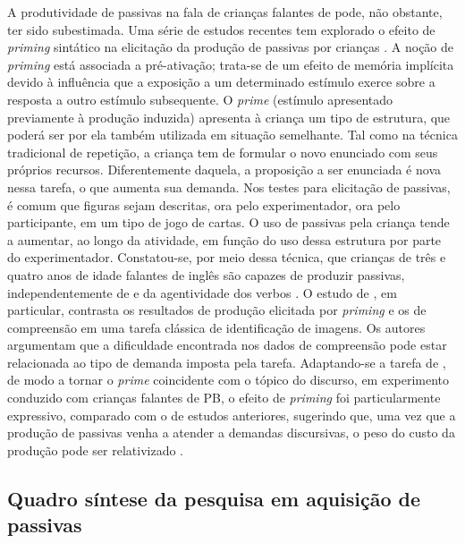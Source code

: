 \documentclass[output=paper]{LSP/langsci}
\begin{document}
A produtividade de passivas na fala de crianças falantes de  pode, não obstante, ter sido subestimada. Uma série de estudos recentes tem explorado o efeito de \textit{priming} sintático na elicitação da produção de passivas por crianças \citep{bencinivalian2008,manetti2012,messenger_etal2012}. A noção de \textit{priming} está associada a pré-ativação; trata-se de um efeito de memória implícita devido à influência que a exposição a um determinado estímulo exerce sobre a resposta a outro estímulo subsequente. O \textit{prime} (estímulo apresentado previamente à produção induzida) apresenta à criança um tipo de estrutura, que poderá ser por ela também utilizada em situação semelhante. Tal como na técnica tradicional de repetição, a criança tem de formular o novo enunciado com seus próprios recursos. Diferentemente daquela, a proposição a ser enunciada é nova nessa tarefa, o que aumenta sua demanda. Nos testes para elicitação de passivas, é comum que figuras sejam descritas, ora pelo experimentador, ora pelo participante, em um tipo de jogo de cartas. O uso de passivas pela criança tende a aumentar, ao longo da atividade, em função do uso dessa estrutura por parte do experimentador. Constatou-se, por meio dessa técnica, que crianças de três e quatro anos de idade falantes de inglês são capazes de produzir passivas, independentemente de  e da agentividade dos verbos \citep{bencinivalian2008,messenger_etal2012}. O estudo de \citet{messenger_etal2012}, em particular, contrasta os resultados de produção elicitada por \textit{priming} e os de compreensão em uma tarefa clássica de identificação de imagens. Os autores argumentam que a dificuldade encontrada nos dados de compreensão pode estar relacionada ao tipo de demanda imposta pela tarefa. Adaptando-se a tarefa de \citet{messenger_etal2012}, de modo a tornar o \textit{prime} coincidente com o tópico do discurso, em experimento conduzido com crianças falantes de PB, o efeito de \textit{priming} foi particularmente expressivo, comparado com o de estudos anteriores, sugerindo que, uma vez que a produção de passivas venha a atender a demandas discursivas, o peso do custo da produção pode ser relativizado \citep{limajunior2016}.

\subsection{Quadro síntese da pesquisa em aquisição de passivas}
\label{subsec:correapassiva_quadro}
\end{document}
